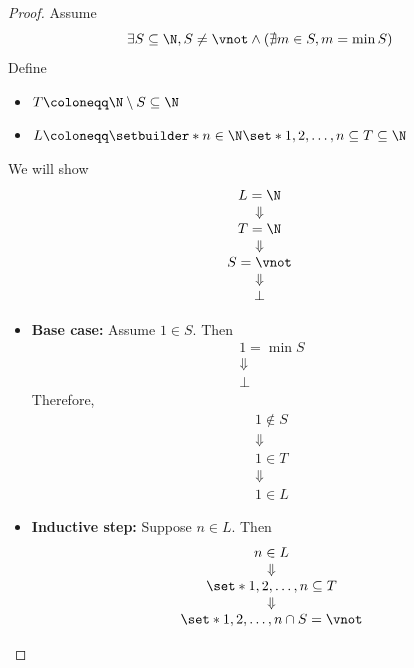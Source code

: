 \begin{proof}
  Assume
  \[
    \exists S \subseteq \N, S \neq \vnot \land (\nexists m \in S, m = \min S)
  \]
  Define
  \begin{itemize}
    \item $T \coloneqq \N \setminus S \subseteq \N$
    \item $L \coloneqq \setbuilder*{n \in \N}{\set*{1, 2, \dots, n} \subseteq T} \subseteq \N$
  \end{itemize}
  We will show
  \[
    \begin{array}{c}
      L = \N     \\
      \Downarrow \\
      T = \N     \\
      \Downarrow \\
      S = \vnot  \\
      \Downarrow \\
      \bot
    \end{array}
  \]
  \begin{itemize}
    \item \textbf{Base case:} Assume $1 \in S$. Then
          \[
            \begin{array}{c}
              1 = \min S \\
              \Downarrow \\
              \bot
            \end{array}
          \]
          Therefore,
          \[
            \begin{array}{c}
              1 \notin S \\
              \Downarrow \\
              1 \in T    \\
              \Downarrow \\
              1 \in L
            \end{array}
          \]
    \item \textbf{Inductive step:} Suppose $n \in L$. Then
          \[
            \begin{array}{c}
              n \in L                           \\
              \Downarrow                        \\
              \set*{1, 2, \dots, n} \subseteq T \\
              \Downarrow                        \\
              \set*{1, 2, \dots, n} \cap S = \vnot
            \end{array}
\]
\end{itemize}
\end{proof}
